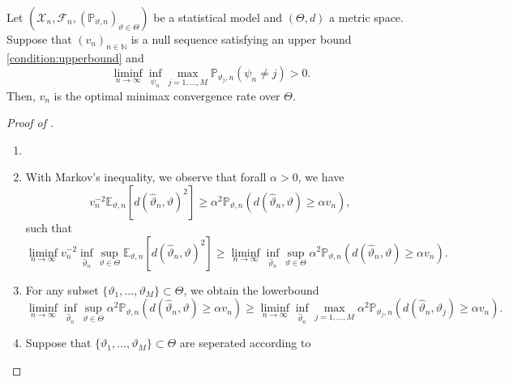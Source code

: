 \documentclass{book}
\begin{document}
\begin{proposition}
	\label{result:reduction_scheme}
	Let $(\mathcal{X}_n, \mathcal{F}_n, (\mathbb{P}_{\vartheta,n})_{\vartheta \in \Theta})$ be a statistical model and $(\Theta, d)$ a metric space. Suppose that $(v_n)_{n \in \mathbb{N}}$ is a null sequence satisfying an upper bound \eqref{condition:upperbound} and
	\begin{equation*}
		\liminf_{n \rightarrow \infty} \inf_{\psi_n} \max_{j=1,\dots,M} \mathbb{P}_{\vartheta_j,n}(\psi_n \neq j)>0.
	\end{equation*}
	Then, $v_n$ is the optimal minimax convergence rate over $\Theta$.
\end{proposition}
\begin{proof}[Proof of ]
	\begin{enumerate}
		\item[]
		\item With Markov's inequality, we observe that forall $\alpha>0$, we have
		      \begin{equation*}
			      v_{n}^{-2}\mathbb{E}_{\vartheta,n}[d(\hat{\vartheta}_n, \vartheta)^{2}] \geq \alpha^{2}\mathbb{P}_{\vartheta,n}(d(\hat{\vartheta}_n, \vartheta) \geq \alpha v_n),
		      \end{equation*}
		      such that
		      \begin{equation*}
			      \liminf_{n \rightarrow \infty} v_n^{-2} \inf_{\hat{\vartheta}_n} \sup_{\vartheta \in \Theta} \mathbb{E}_{\vartheta,n}[d(\hat{\vartheta}_{n}, \vartheta)^{2}] \geq \liminf_{n \rightarrow \infty} \inf_{\hat{\vartheta}_n} \sup_{\vartheta \in \Theta} \alpha^{2}\mathbb{P}_{\vartheta,n}(d(\hat{\vartheta}_n, \vartheta) \geq \alpha v_n).
		      \end{equation*}
		\item For any subset $\{\vartheta_1, \dots, \vartheta_M\} \subset \Theta$, we obtain the lowerbound
		      \begin{equation*}
			      \liminf_{n \rightarrow \infty} \inf_{\hat{\vartheta}_n} \sup_{\vartheta \in \Theta} \alpha^{2}\mathbb{P}_{\vartheta,n}(d(\hat{\vartheta}_n, \vartheta) \geq \alpha v_n) \geq \liminf_{n \rightarrow \infty} \inf_{\hat{\vartheta}_n} \max_{j=1,\dots,M} \alpha^{2}\mathbb{P}_{\vartheta_j,n}(d(\hat{\vartheta}_n, \vartheta_j) \geq \alpha v_n).
		      \end{equation*}
		\item Suppose that $\{\vartheta_1, \dots, \vartheta_M\} \subset \Theta$ are seperated according to

\end{enumerate}
\end{proof}
\end{document}
